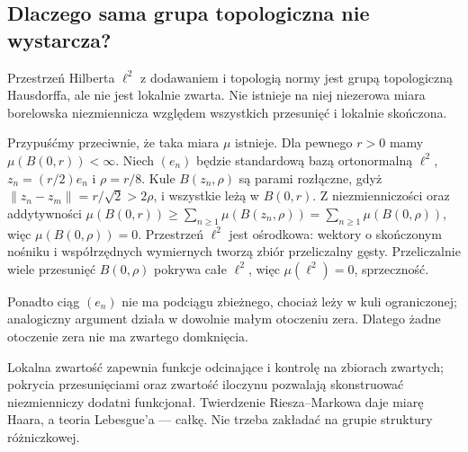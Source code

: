 \subsection*{Dlaczego sama grupa topologiczna nie wystarcza?}
\begin{przyklad}
Przestrzeń Hilberta $\ell^2$ z dodawaniem i topologią normy jest grupą topologiczną Hausdorffa, ale nie jest lokalnie zwarta. Nie istnieje na niej niezerowa miara borelowska niezmiennicza względem wszystkich przesunięć i lokalnie skończona.

Przypuśćmy przeciwnie, że taka miara $\mu$ istnieje. Dla pewnego $r>0$ mamy $\mu(B(0,r))<\infty$. Niech $(e_n)$ będzie standardową bazą ortonormalną $\ell^2$, $z_n=(r/2)e_n$ i $\rho=r/8$. Kule $B(z_n,\rho)$ są parami rozłączne, gdyż $\|z_n-z_m\|=r/\sqrt2>2\rho$, i wszystkie leżą w $B(0,r)$. Z niezmienniczości oraz addytywności
$\mu(B(0,r))\ge\sum_{n\ge1}\mu(B(z_n,\rho))=\sum_{n\ge1}\mu(B(0,\rho))$, więc $\mu(B(0,\rho))=0$. Przestrzeń $\ell^2$ jest ośrodkowa: wektory o skończonym nośniku i współrzędnych wymiernych tworzą zbiór przeliczalny gęsty. Przeliczalnie wiele przesunięć $B(0,\rho)$ pokrywa całe $\ell^2$, więc $\mu(\ell^2)=0$, sprzeczność.

Ponadto ciąg $(e_n)$ nie ma podciągu zbieżnego, chociaż leży w kuli ograniczonej; analogiczny argument działa w dowolnie małym otoczeniu zera. Dlatego żadne otoczenie zera nie ma zwartego domknięcia.
\end{przyklad}
Lokalna zwartość zapewnia funkcje odcinające i kontrolę na zbiorach zwartych; pokrycia przesunięciami oraz zwartość iloczynu pozwalają skonstruować niezmienniczy dodatni funkcjonał. Twierdzenie Riesza--Markowa daje miarę Haara, a teoria Lebesgue'a --- całkę. Nie trzeba zakładać na grupie struktury różniczkowej.

